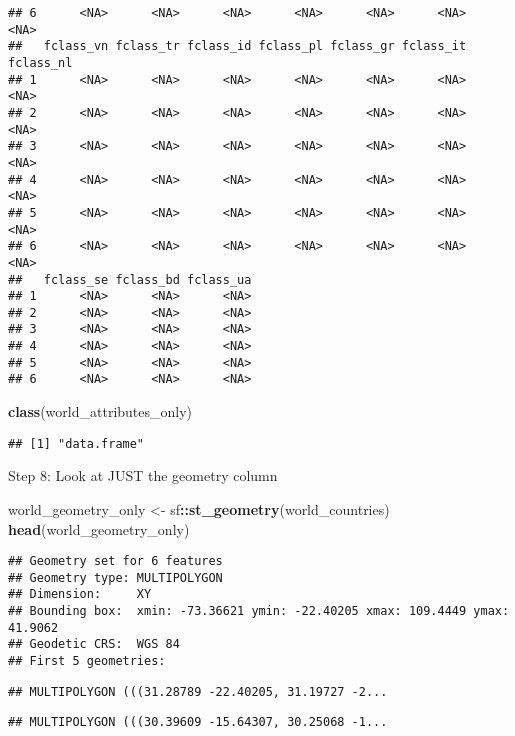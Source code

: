 \documentclass[
]{article}
\newenvironment{Shaded}{\begin{snugshade}}{\end{snugshade}}
\newcommand{\FunctionTok}[1]{\textcolor[rgb]{0.13,0.29,0.53}{\textbf{#1}}}
\newcommand{\NormalTok}[1]{#1}
\newcommand{\OtherTok}[1]{\textcolor[rgb]{0.56,0.35,0.01}{#1}}
\newcommand{\SpecialCharTok}[1]{\textcolor[rgb]{0.81,0.36,0.00}{\textbf{#1}}}
\begin{document}
\begin{verbatim}
## 6      <NA>      <NA>      <NA>      <NA>      <NA>      <NA>      <NA>
##   fclass_vn fclass_tr fclass_id fclass_pl fclass_gr fclass_it fclass_nl
## 1      <NA>      <NA>      <NA>      <NA>      <NA>      <NA>      <NA>
## 2      <NA>      <NA>      <NA>      <NA>      <NA>      <NA>      <NA>
## 3      <NA>      <NA>      <NA>      <NA>      <NA>      <NA>      <NA>
## 4      <NA>      <NA>      <NA>      <NA>      <NA>      <NA>      <NA>
## 5      <NA>      <NA>      <NA>      <NA>      <NA>      <NA>      <NA>
## 6      <NA>      <NA>      <NA>      <NA>      <NA>      <NA>      <NA>
##   fclass_se fclass_bd fclass_ua
## 1      <NA>      <NA>      <NA>
## 2      <NA>      <NA>      <NA>
## 3      <NA>      <NA>      <NA>
## 4      <NA>      <NA>      <NA>
## 5      <NA>      <NA>      <NA>
## 6      <NA>      <NA>      <NA>
\end{verbatim}

\begin{Shaded}
\begin{Highlighting}[]
\FunctionTok{class}\NormalTok{(world\_attributes\_only)}
\end{Highlighting}
\end{Shaded}

\begin{verbatim}
## [1] "data.frame"
\end{verbatim}

Step 8: Look at JUST the geometry column

\begin{Shaded}
\begin{Highlighting}[]
\NormalTok{world\_geometry\_only }\OtherTok{\textless{}{-}}\NormalTok{ sf}\SpecialCharTok{::}\FunctionTok{st\_geometry}\NormalTok{(world\_countries)}
\FunctionTok{head}\NormalTok{(world\_geometry\_only)}
\end{Highlighting}
\end{Shaded}

\begin{verbatim}
## Geometry set for 6 features 
## Geometry type: MULTIPOLYGON
## Dimension:     XY
## Bounding box:  xmin: -73.36621 ymin: -22.40205 xmax: 109.4449 ymax: 41.9062
## Geodetic CRS:  WGS 84
## First 5 geometries:
\end{verbatim}

\begin{verbatim}
## MULTIPOLYGON (((31.28789 -22.40205, 31.19727 -2...
\end{verbatim}

\begin{verbatim}
## MULTIPOLYGON (((30.39609 -15.64307, 30.25068 -1...
\end{verbatim}
\end{document}
